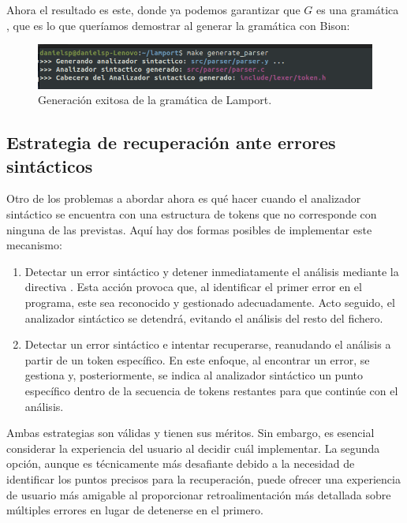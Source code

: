 Ahora el resultado es este, donde ya podemos garantizar que $G$ es una gramática , que es lo que queríamos demostrar al generar la gramática con Bison:
\begin{figure}[h]
    \includegraphics[width=\linewidth]{images/implementacion/parser/parser_success.png}
    \caption{Generación exitosa de la gramática de Lamport.}
    \label{fig:parser_success}
\end{figure}

\subsection{Estrategia de recuperación ante errores sintácticos}
Otro de los problemas a abordar ahora es qué hacer cuando el analizador sintáctico se encuentra con una estructura de tokens que no corresponde con ninguna de las previstas. Aquí hay dos formas posibles de implementar este mecanismo:

\begin{enumerate}
    \item Detectar un error sintáctico y detener inmediatamente el análisis mediante la directiva . Esta acción provoca que, al identificar el primer error en el programa, este sea reconocido y gestionado adecuadamente. Acto seguido, el analizador sintáctico se detendrá, evitando el análisis del resto del fichero.
    
    \item Detectar un error sintáctico e intentar recuperarse, reanudando el análisis a partir de un token específico. En este enfoque, al encontrar un error, se gestiona y, posteriormente, se indica al analizador sintáctico un punto específico dentro de la secuencia de tokens restantes para que continúe con el análisis.
\end{enumerate}

Ambas estrategias son válidas y tienen sus méritos. Sin embargo, es esencial considerar la experiencia del usuario al decidir cuál implementar. La segunda opción, aunque es técnicamente más desafiante debido a la necesidad de identificar los puntos precisos para la recuperación, puede ofrecer una experiencia de usuario más amigable al proporcionar retroalimentación más detallada sobre múltiples errores en lugar de detenerse en el primero.

